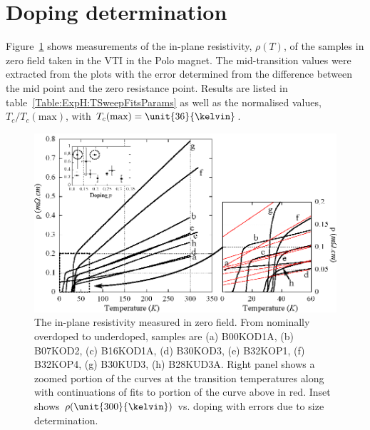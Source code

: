
\section{Doping determination}

Figure~\ref{Fig:ExpH:TSweeps} shows measurements of the in-plane resistivity, $\rho(T)$, of the samples in zero field taken in the \ac{VTI} in the Polo magnet. The mid-transition \Tc values were extracted from the plots with the error determined from the difference between the mid point and the zero resistance point. Results are listed in table~\ref{Table:ExpH:TSweepFitsParams} as well as the normalised \Tc values, $T_c/T_c(\textrm{max})$, with $T_c(\textrm{max}) = \unit{36}{\kelvin}$.

\begin{figure}[htbp]
	\begin{center}
		\includegraphics[scale=0.9]{Chapter-HallBSCO/Figures/TSweeps/TSweeps}
		\caption{The in-plane resistivity measured in zero field. From nominally overdoped to underdoped, samples are (a) B00KOD1A, (b) B07KOD2, (c) B16KOD1A, (d) B30KOD3, (e) B32KOP1, (f) B32KOP4, (g) B30KUD3, (h) B28KUD3A. Right panel shows a zoomed portion of the curves at the transition temperatures along with continuations of fits to portion of the curve above \Tc in red. Inset shows $\rho(\unit{300}{\kelvin})$ vs. doping with errors due to size determination.}
		\label{Fig:ExpH:TSweeps}
	\end{center}
\end{figure}

